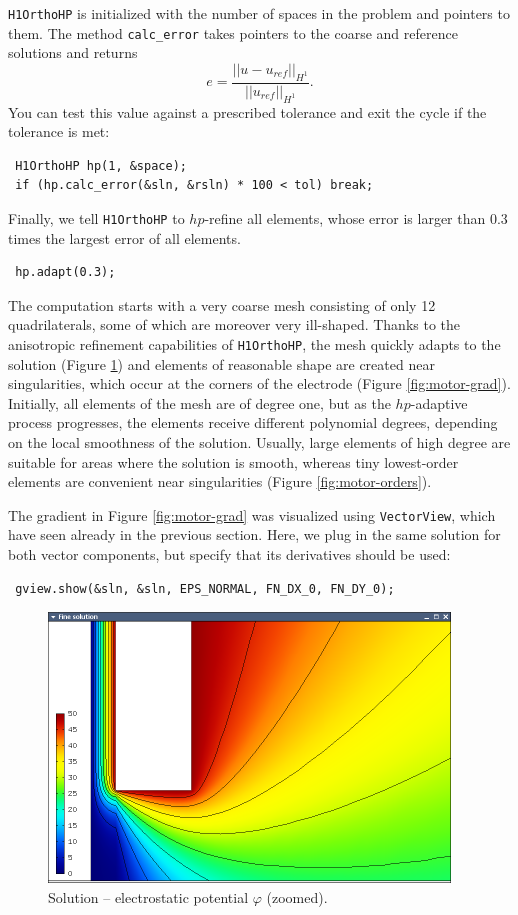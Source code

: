 {\tt H1OrthoHP} is initialized with the number of spaces in the problem and pointers to them.
The method \verb"calc_error" takes pointers to the coarse and reference solutions and returns
$$e = \frac{|| u - u_{ref} ||_{H^1}}{|| u_{ref} ||_{H^1}}.$$
You can test this value against a prescribed tolerance and exit the cycle if the tolerance is met:
\begin{lstlisting}
 H1OrthoHP hp(1, &space);
 if (hp.calc_error(&sln, &rsln) * 100 < tol) break;
\end{lstlisting}

Finally, we tell {\tt H1OrthoHP} to $hp$-refine all elements, whose error is larger than
0.3 times the largest error of all elements.
\begin{lstlisting}
 hp.adapt(0.3);
\end{lstlisting}

The computation starts with a very coarse mesh consisting of only 12 quadrilaterals, some
of which are moreover very ill-shaped. Thanks to the anisotropic refinement capabilities
of {\tt H1OrthoHP}, the mesh quickly adapts to the solution (Figure \ref{fig:motor-sln})
and elements of reasonable shape are created near singularities, which occur at the
corners of the electrode (Figure \ref{fig:motor-grad}). Initially, all elements of the
mesh are of degree one, but as the $hp$-adaptive process progresses, the elements receive
different polynomial degrees, depending on the local smoothness of the solution.
Usually, large elements of high degree are suitable for areas where the solution is smooth,
whereas tiny lowest-order elements are convenient near singularities
(Figure \ref{fig:motor-orders}).

The gradient in Figure \ref{fig:motor-grad} was visualized using {\tt VectorView}, which have
seen already in the previous section. Here, we plug in the same solution for both vector
components, but specify that its derivatives should be used:
\begin{lstlisting}
 gview.show(&sln, &sln, EPS_NORMAL, FN_DX_0, FN_DY_0);
\end{lstlisting}


\begin{figure}[ht]
  \medskip \centering
  \includegraphics[width=0.95\textwidth]{img/motor-sln.png}
  \caption{Solution -- electrostatic potential $\varphi$ (zoomed).}
  \label{fig:motor-sln}
\end{figure}

